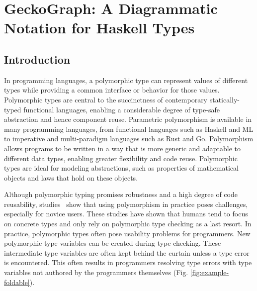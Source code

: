 


\chapter{GeckoGraph: A Diagrammatic Notation for Haskell Types}

\label{chap:gecko-graph} 
\graphicspath{{Figures/GeckoGraph}}


\section{Introduction} \label{sec:intro}
In programming languages, a polymorphic type \cite{Cardelli1987-fp} can represent values of different types while providing a common interface or behavior for those values. Polymorphic types are central to the succinctness of contemporary statically-typed functional languages, enabling a considerable degree of type-safe abstraction and hence component reuse. Parametric polymorphism is available in many programming languages, from functional languages such as Haskell and ML to imperative and multi-paradigm languages such as Rust\cite{Klabnik_undated-wx} and Go\cite{Griesemer_undated-ff}. Polymorphism allows programs to be written in a way that is more generic and adaptable to different data types, enabling greater flexibility and code reuse. Polymorphic types are ideal for modeling abstractions, such as properties of mathematical objects and laws that hold on these objects. 

Although polymorphic typing promises robustness and a high degree of code reusability, studies~\cite{Jun2000-ec, Jun2000-yu} show that using polymorphism in practice poses challenges, especially for novice users. These studies have shown that humans tend to focus on concrete types and only rely on polymorphic type checking as a last resort. In practice, polymorphic types often pose usability problems for programmers. New polymorphic type variables can be created during type checking. These intermediate type variables are often kept behind the curtain unless a type error is encountered. This often results in programmers resolving type errors with type variables not authored by the programmers themselves (Fig. \ref{fig:example-foldable}).


